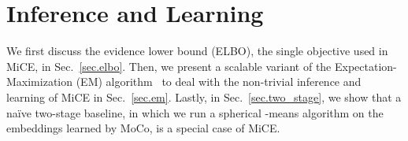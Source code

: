 \documentclass{article} \usepackage{iclr2021_conference,times}
\begin{document}
\section{Inference and Learning}
We first discuss the evidence lower bound (ELBO), the single objective used in MiCE, in Sec.~\ref{sec.elbo}. Then, we present a scalable variant of the Expectation-Maximization (EM) algorithm~\citep{dempster1977maximum} to deal with the non-trivial inference and learning of MiCE in Sec.~\ref{sec.em}. Lastly, in Sec.~\ref{sec.two_stage}, we show that a naïve two-stage baseline, in which we run a spherical -means algorithm on the embeddings learned by MoCo, is a special case of MiCE.
\end{document}
